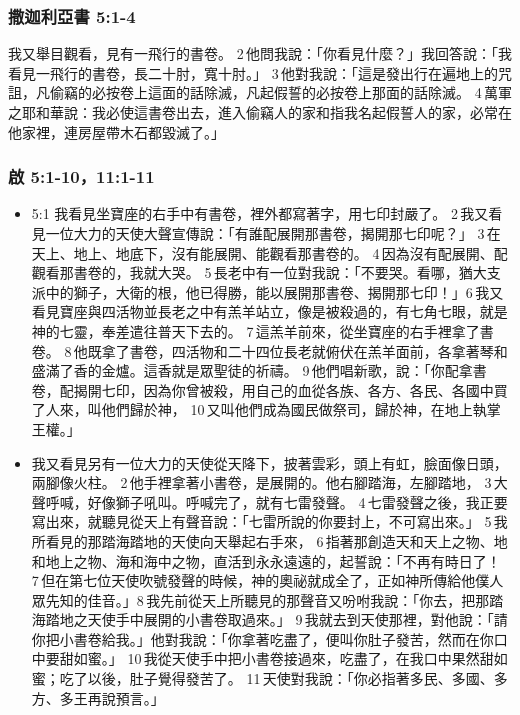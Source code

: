 \subsubsection{撒迦利亞書 5:1-4}
我又舉目觀看，見有一飛行的書卷。 2 他問我說：「你看見什麼？」我回答說：「我看見一飛行的書卷，長二十肘，寬十肘。」 3 他對我說：「這是發出行在遍地上的咒詛，凡偷竊的必按卷上這面的話除滅，凡起假誓的必按卷上那面的話除滅。 4 萬軍之耶和華說：我必使這書卷出去，進入偷竊人的家和指我名起假誓人的家，必常在他家裡，連房屋帶木石都毀滅了。」



\subsubsection{啟 5:1-10，11:1-11}
\begin{itemize} 
\itemsep-.25em
\item 5:1 我看見坐寶座的右手中有書卷，裡外都寫著字，用七印封嚴了。 2 我又看見一位大力的天使大聲宣傳說：「有誰配展開那書卷，揭開那七印呢？」 3 在天上、地上、地底下，沒有能展開、能觀看那書卷的。 4 因為沒有配展開、配觀看那書卷的，我就大哭。 5 長老中有一位對我說：「不要哭。看哪，猶大支派中的獅子，大衛的根，他已得勝，能以展開那書卷、揭開那七印！」6 我又看見寶座與四活物並長老之中有羔羊站立，像是被殺過的，有七角七眼，就是神的七靈，奉差遣往普天下去的。 7 這羔羊前來，從坐寶座的右手裡拿了書卷。 8 他既拿了書卷，四活物和二十四位長老就俯伏在羔羊面前，各拿著琴和盛滿了香的金爐。這香就是眾聖徒的祈禱。 9 他們唱新歌，說：「你配拿書卷，配揭開七印，因為你曾被殺，用自己的血從各族、各方、各民、各國中買了人來，叫他們歸於神， 10 又叫他們成為國民做祭司，歸於神，在地上執掌王權。」
\item 我又看見另有一位大力的天使從天降下，披著雲彩，頭上有虹，臉面像日頭，兩腳像火柱。 2 他手裡拿著小書卷，是展開的。他右腳踏海，左腳踏地， 3 大聲呼喊，好像獅子吼叫。呼喊完了，就有七雷發聲。 4 七雷發聲之後，我正要寫出來，就聽見從天上有聲音說：「七雷所說的你要封上，不可寫出來。」 5 我所看見的那踏海踏地的天使向天舉起右手來， 6 指著那創造天和天上之物、地和地上之物、海和海中之物，直活到永永遠遠的，起誓說：「不再有時日了！ 7 但在第七位天使吹號發聲的時候，神的奧祕就成全了，正如神所傳給他僕人眾先知的佳音。」8 我先前從天上所聽見的那聲音又吩咐我說：「你去，把那踏海踏地之天使手中展開的小書卷取過來。」 9 我就去到天使那裡，對他說：「請你把小書卷給我。」他對我說：「你拿著吃盡了，便叫你肚子發苦，然而在你口中要甜如蜜。」 10 我從天使手中把小書卷接過來，吃盡了，在我口中果然甜如蜜；吃了以後，肚子覺得發苦了。 11 天使對我說：「你必指著多民、多國、多方、多王再說預言。」
\end{itemize} 







